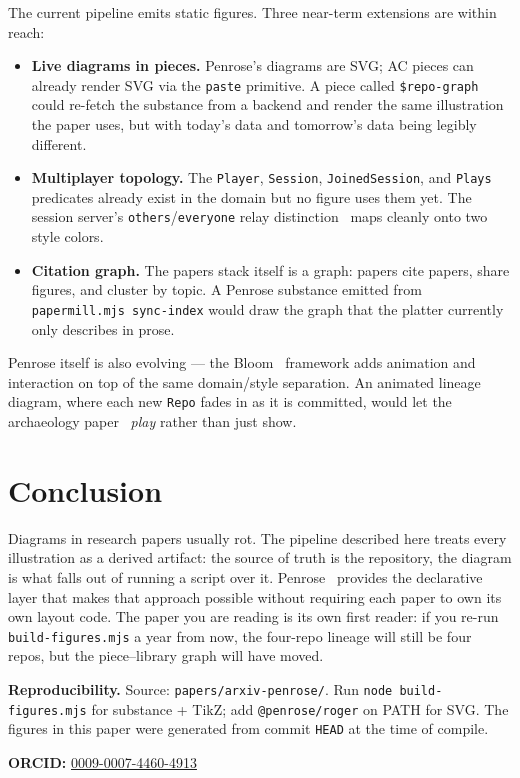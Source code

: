 \documentclass[10pt,letterpaper,twocolumn]{article}
\begin{document}
The current pipeline emits static figures. Three near-term extensions are within reach:

\begin{itemize}
  \item \textbf{Live diagrams in pieces.} Penrose's diagrams are SVG; AC pieces can already render SVG via the \texttt{paste} primitive. A piece called \texttt{\$repo-graph} could re-fetch the substance from a backend and render the same illustration the paper uses, but with today's data and tomorrow's data being legibly different.
  \item \textbf{Multiplayer topology.} The \texttt{Player}, \texttt{Session}, \texttt{JoinedSession}, and \texttt{Plays} predicates already exist in the domain but no figure uses them yet. The session server's \texttt{others}/\texttt{everyone} relay distinction~\citep{scudder2026ac} maps cleanly onto two style colors.
  \item \textbf{Citation graph.} The papers stack itself is a graph: papers cite papers, share figures, and cluster by topic. A Penrose substance emitted from \texttt{papermill.mjs sync-index} would draw the graph that the platter currently only describes in prose.
\end{itemize}

Penrose itself is also evolving --- the Bloom~\citep{bloom2024} framework adds animation and interaction on top of the same domain/style separation. An animated lineage diagram, where each new \texttt{Repo} fades in as it is committed, would let the archaeology paper~\citep{scudder2026archaeology} \emph{play} rather than just show.

\section{Conclusion}

Diagrams in research papers usually rot. The pipeline described here treats every illustration as a derived artifact: the source of truth is the repository, the diagram is what falls out of running a script over it. Penrose~\citep{ye2020penrose} provides the declarative layer that makes that approach possible without requiring each paper to own its own layout code. The paper you are reading is its own first reader: if you re-run \texttt{build-figures.mjs} a year from now, the four-repo lineage will still be four repos, but the piece--library graph will have moved.

\vspace{0.5em}
\noindent\textbf{Reproducibility.} Source: \texttt{papers/arxiv-penrose/}. Run \texttt{node build-figures.mjs} for substance + TikZ; add \texttt{@penrose/roger} on PATH for SVG. The figures in this paper were generated from commit \texttt{HEAD} at the time of compile.

\vspace{0.5em}
\noindent\textbf{ORCID:} \href{https://orcid.org/0009-0007-4460-4913}{0009-0007-4460-4913}




\end{document}
